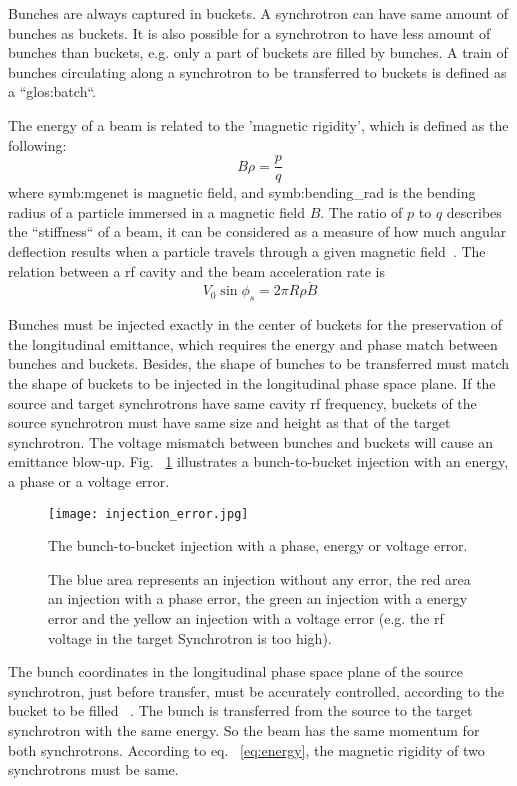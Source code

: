 Bunches are always captured in buckets. A synchrotron can have same amount of bunches as buckets. It is also possible for a synchrotron to have less amount of bunches than buckets, e.g. only a part of buckets are filled by bunches. A train of bunches circulating along a synchrotron to be transferred to buckets is defined as a ``\gls{glos:batch}``.

The energy of a beam is related to the 'magnetic rigidity', which is defined as the following:
\begin{equation}
	\label{eq:energy}
	B\rho =\frac{p}{q}
\end{equation}
where \gls{symb:mgenet} is magnetic field, and \gls{symb:bending_rad} is the bending radius of a particle immersed in a magnetic field $B$. The ratio of $p$ to $q$ describes the ``stiffness`` of a beam, it can be considered as a measure of how much angular deflection results when a particle travels through a given magnetic field~\cite{barletta_overview_????}. The relation between a rf cavity and the beam acceleration rate is
\begin{equation}
	\label{eq:rf_acceleration}
	V_0\sin\phi_s=2\pi R\rho\dot{B}
\end{equation}

Bunches must be injected exactly in the center of buckets for the preservation of the longitudinal emittance, which requires the energy and phase match between bunches and buckets. Besides, the shape of bunches to be transferred must match the shape of buckets to be injected in the longitudinal phase space plane. If the source and target synchrotrons have same cavity rf frequency, buckets of the source synchrotron must have same size and height as that of the target synchrotron. The voltage mismatch between bunches and buckets will cause an emittance blow-up. Fig. ~\ref{injection_error} illustrates a bunch-to-bucket injection with an energy, a phase or a voltage error. 
\begin{figure}[!htb]
   \centering   
   \texttt{[image: injection\_error.jpg]}
   \caption{The bunch-to-bucket injection with a phase, energy or voltage error.}
	\caption*{The blue area represents an injection without any error, the red area an injection with a phase error, the green an injection with a energy error and the yellow an injection with a voltage error (e.g. the rf voltage in the target Synchrotron is too high).}
   \label{injection_error}
\end{figure} 

The bunch coordinates in the longitudinal phase space plane of the source synchrotron, just before transfer, must be accurately controlled, according to the bucket to be filled ~\cite{garoby_timing_1984}. The bunch is transferred from the source to the target synchrotron with the same energy. So the beam has the same momentum for both synchrotrons. According to eq. ~\ref{eq:energy}, the magnetic rigidity of two synchrotrons must be same.

